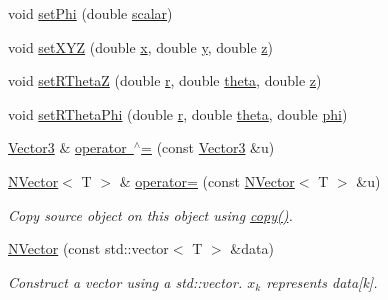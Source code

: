 \begin{DoxyCompactItemize}
\item 
void \mbox{\hyperlink{class_vector3_a6a5aa0401fbcc6cfcde68ba486153b16}{set\+Phi}} (double \mbox{\hyperlink{class_vector3_af757c4bd03bd4ddfa74c99fd5a3eee94}{scalar}})
\item 
void \mbox{\hyperlink{class_vector3_accc0a2a83b45ba13ba0bc9f238e6d103}{set\+X\+YZ}} (double \mbox{\hyperlink{class_vector3_a58680da7b1109919f9912cc8c5d4d54d}{x}}, double \mbox{\hyperlink{class_vector3_aa86961f470134f1c7ca3eec7a88ad069}{y}}, double \mbox{\hyperlink{class_vector3_aff9b42255ac1e08c52a5eda5a4513a48}{z}})
\item 
void \mbox{\hyperlink{class_vector3_ad92ad388f1fb1d35c4efbd53d2c00776}{set\+R\+ThetaZ}} (double \mbox{\hyperlink{class_vector3_acbf6dfc367121fd82a153c4593306145}{r}}, double \mbox{\hyperlink{class_vector3_a30c86ee94c98070b469a56fa4f7fde4f}{theta}}, double \mbox{\hyperlink{class_vector3_aff9b42255ac1e08c52a5eda5a4513a48}{z}})
\item 
void \mbox{\hyperlink{class_vector3_a8f5b7f22c561c335017ad3a76bcd1808}{set\+R\+Theta\+Phi}} (double \mbox{\hyperlink{class_vector3_acbf6dfc367121fd82a153c4593306145}{r}}, double \mbox{\hyperlink{class_vector3_a30c86ee94c98070b469a56fa4f7fde4f}{theta}}, double \mbox{\hyperlink{class_vector3_af04a3d08dae7f1ba36ee3feaf3bc8a4c}{phi}})
\item 
\mbox{\hyperlink{class_vector3}{Vector3}} \& \mbox{\hyperlink{class_vector3_a2f9f8d7b5cd54c6a78a2a8930d075926}{operator $^\wedge$=}} (const \mbox{\hyperlink{class_vector3}{Vector3}} \&u)
\item 
\mbox{\hyperlink{class_n_vector}{N\+Vector}}$<$ T $>$ \& \mbox{\hyperlink{class_vector3_ab793bf6d3d3fc05f91f435c1c0a8e5ea}{operator=}} (const \mbox{\hyperlink{class_n_vector}{N\+Vector}}$<$ T $>$ \&u)
\begin{DoxyCompactList}\small\item\em Copy source object on this object using {\ttfamily \mbox{\hyperlink{class_n_vector_a67128d2ff536b8ccd7a95cb680bd0431}{copy()}}}. \end{DoxyCompactList}\item 
\mbox{\hyperlink{class_vector3_a786957fb5d1d9bdec7e6ced65bce03c0}{N\+Vector}} (const std\+::vector$<$ T $>$ \&data)
\begin{DoxyCompactList}\small\item\em Construct a vector using a {\ttfamily std\+::vector}. $ x_k $ represents {\ttfamily data\mbox{[}k\mbox{]}}. \end{DoxyCompactList}\item 

\end{DoxyCompactItemize}
